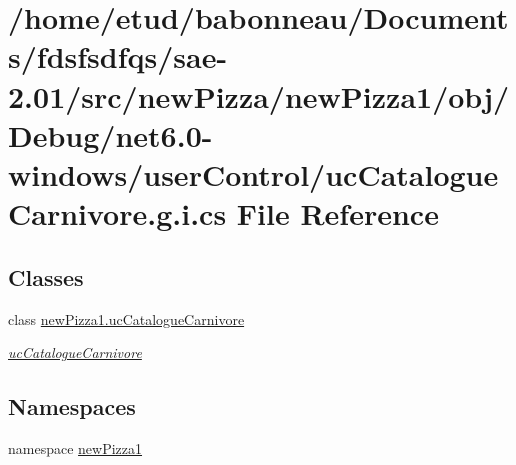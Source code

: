 \hypertarget{net6_80-windows_2userControl_2ucCatalogueCarnivore_8g_8i_8cs}{}\section{/home/etud/babonneau/\+Documents/fdsfsdfqs/sae-\/2.01/src/new\+Pizza/new\+Pizza1/obj/\+Debug/net6.0-\/windows/user\+Control/uc\+Catalogue\+Carnivore.g.\+i.\+cs File Reference}
\label{net6_80-windows_2userControl_2ucCatalogueCarnivore_8g_8i_8cs}
\subsection*{Classes}
\begin{DoxyCompactItemize}
\item 
class \hyperlink{classnewPizza1_1_1ucCatalogueCarnivore}{new\+Pizza1.\+uc\+Catalogue\+Carnivore}
\begin{DoxyCompactList}\small\item\em \hyperlink{classnewPizza1_1_1ucCatalogueCarnivore}{uc\+Catalogue\+Carnivore} \end{DoxyCompactList}\end{DoxyCompactItemize}
\subsection*{Namespaces}
\begin{DoxyCompactItemize}
\item 
namespace \hyperlink{namespacenewPizza1}{new\+Pizza1}
\end{DoxyCompactItemize}
